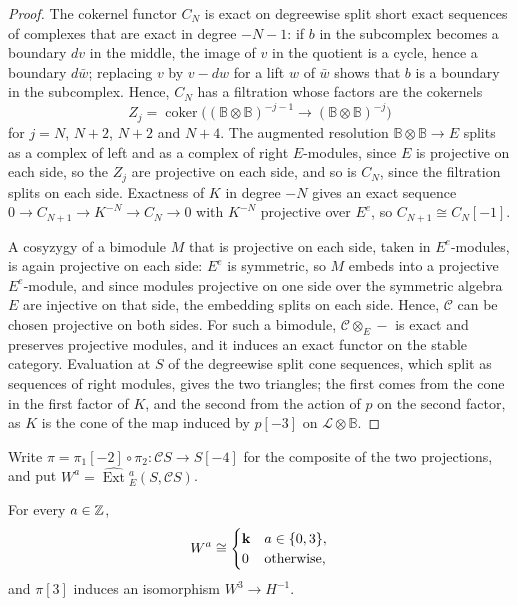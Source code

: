 \begin{proof}
  The cokernel functor $C_N$ is exact on degreewise split short exact
  sequences of complexes that are exact in degree ${-N-1}$: if $b$ in the
  subcomplex becomes a boundary $dv$ in the middle, the image of $v$ in the
  quotient is a cycle, hence a boundary $d\bar{w}$; replacing $v$ by
  ${v-dw}$ for a lift $w$ of $\bar{w}$ shows that $b$ is a boundary in the
  subcomplex. Hence, $C_N$ has a filtration whose factors are the cokernels
  \[
    Z_j=\operatorname{coker}\bigl((\mathbb{B}\otimes\mathbb{B})^{-j-1}\to
    (\mathbb{B}\otimes\mathbb{B})^{-j}\bigr)
  \]
  for ${j=N}$, ${N+2}$, ${N+2}$ and ${N+4}$. The
  augmented resolution ${\mathbb{B}\otimes\mathbb{B}\to E}$ splits as a complex
  of left and as a complex of right $E$-modules, since $E$ is projective on
  each side, so the $Z_j$ are projective on each side, and so is $C_N$, since
  the filtration splits on each side. Exactness of $K$ in degree ${-N}$ gives an
  exact sequence ${0\to C_{N+1}\to K^{-N}\to C_N\to0}$ with $K^{-N}$ projective
  over $E^e$, so ${C_{N+1}\cong C_N[-1]}$.

  A cosyzygy of a bimodule $M$ that is projective on each side, taken in
  $E^e$-modules, is again projective on each side: $E^e$ is symmetric, so $M$
  embeds into a projective $E^e$-module, and since modules projective on one
  side over the symmetric algebra $E$ are injective on that side, the embedding
  splits on each side. Hence, $\mathcal{C}$ can be chosen projective on both
  sides. For such a bimodule, ${\mathcal{C}\otimes_E-}$ is exact and preserves
  projective modules, and it induces an exact functor on the stable category.
  Evaluation at $S$ of the degreewise split cone sequences, which split as
  sequences of right modules, gives the two triangles; the first comes from the
  cone in the first factor of $K$, and the second from the action of $p$ on the
  second factor, as $K$ is the cone of the map induced by ${p[-3]}$ on
  ${\mathcal{L}\otimes\mathbb{B}}$.
\end{proof}

Write ${\pi=\pi_1[-2]\circ\pi_2\colon\mathcal{C}S\to S[-4]}$ for the composite
of the two projections, and put ${W^a=\widehat{\operatorname{Ext}}{}^a_E
(S,\mathcal{C}S)}$.

\begin{proposition}
  \label{prop:two-cone-profile}
  For every ${a\in\mathbb{Z}}$,
  \[
    W^a\cong\begin{cases}\kk&a\in\set{0,3},\\0&\text{otherwise,}\end{cases}
  \]
  and $\pi[3]$ induces an isomorphism ${W^3\to H^{-1}}$.
\end{proposition}

